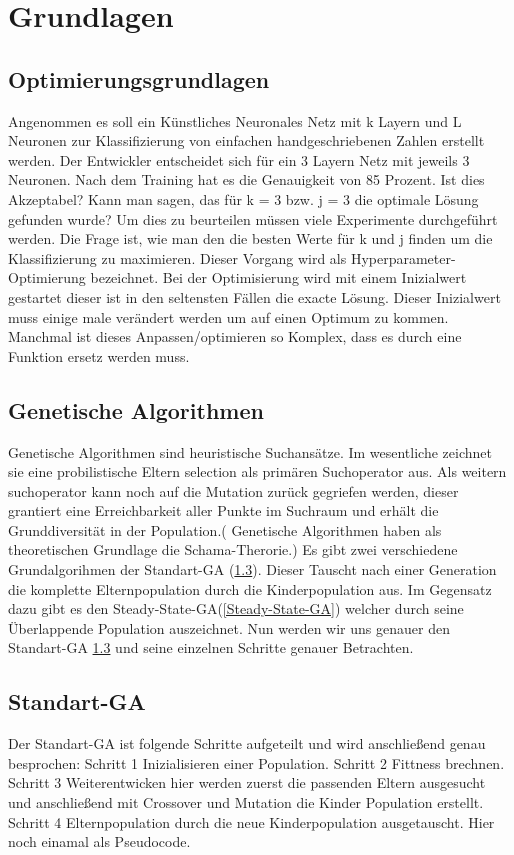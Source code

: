 \section{Grundlagen}
\label{sec:Grundlagen}


\subsection{Optimierungsgrundlagen}
Angenommen es soll ein Künstliches Neuronales Netz mit k Layern und L Neuronen zur Klassifizierung von einfachen handgeschriebenen Zahlen erstellt werden. Der Entwickler entscheidet sich für ein 3 Layern Netz mit jeweils 3 Neuronen. Nach dem Training hat es die Genauigkeit von 85 Prozent. Ist dies Akzeptabel? Kann man sagen, das für k = 3 bzw. j = 3 die optimale Lösung gefunden wurde? Um dies zu beurteilen müssen viele Experimente durchgeführt werden. Die Frage ist, wie man den die besten Werte für k und j finden um die Klassifizierung zu maximieren. Dieser Vorgang wird als Hyperparameter-Optimierung bezeichnet. Bei der Optimisierung wird mit einem Inizialwert gestartet dieser ist in den seltensten Fällen die exacte Lösung. Dieser Inizialwert muss einige male verändert werden um auf einen Optimum zu kommen. Manchmal ist dieses Anpassen/optimieren so Komplex, dass es durch eine Funktion ersetz werden muss.

\subsection{Genetische Algorithmen}
Genetische Algorithmen sind heuristische Suchansätze. Im wesentliche zeichnet sie eine probilistische Eltern selection als primären Suchoperator aus. Als weitern suchoperator kann noch auf die Mutation zurück gegriefen werden, dieser grantiert eine Erreichbarkeit aller Punkte im Suchraum und erhält die Grunddiversität in der Population.( Genetische Algorithmen haben als theoretischen Grundlage die Schama-Therorie.) Es gibt zwei verschiedene Grundalgorihmen der Standart-GA (\ref{Standart-GA}). Dieser Tauscht nach einer Generation die komplette Elternpopulation durch die Kinderpopulation aus. Im Gegensatz dazu gibt es den Steady-State-GA(\ref{Steady-State-GA}) welcher durch seine Überlappende Population auszeichnet. Nun werden wir uns genauer den  Standart-GA \ref{Standart-GA} und seine einzelnen Schritte genauer Betrachten.

 \newpage
 
\subsection{Standart-GA} \label{Standart-GA}
Der Standart-GA ist folgende Schritte aufgeteilt und wird anschließend genau besprochen:
Schritt 1 Inizialisieren einer Population.
Schritt 2 Fittness brechnen.
Schritt 3 Weiterentwicken hier werden zuerst die passenden Eltern ausgesucht und anschließend mit Crossover und Mutation die Kinder Population erstellt. 
Schritt 4 Elternpopulation durch die neue Kinderpopulation ausgetauscht.
Hier noch einamal als Pseudocode.

